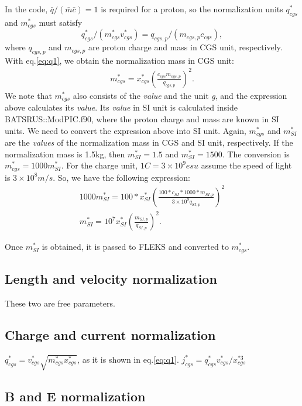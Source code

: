\documentclass[a4paper, 11pt]{article}
\begin{document}
In the code, $\bar{q}/(\bar{m}\bar{c}) = 1$ is required for a proton, so the normalization units $q_{cgs}^*$ and $m_{cgs}^*$ must satisfy 
\begin{equation}
q_{cgs}^*/(m_{cgs}^*v_{cgs}^*) = q_{cgs,p}/(m_{cgs,p}c_{cgs}),     
\end{equation}
where $q_{cgs,p}$ and $m_{cgs,p}$ are proton charge and mass in CGS unit, respectively. With eq.\ref{eq:q1}, we obtain the normalization mass in CGS unit:
\begin{eqnarray}
m_{cgs}^* = x_{cgs}^*(\frac{c_{cgs}m_{cgs,p}}{q_{cgs,p}})^2.
\end{eqnarray}
We note that $m_{cgs}^*$ also consists of the \textit{value} and the unit \textit{g}, and the expression above calculates its \textit{value}. Its \textit{value} in SI unit is calculated inside BATSRUS::ModPIC.f90, where the proton charge and mass are known in SI units. We need to convert the expression above into SI unit. Again, $m_{cgs}^*$ and $m_{SI}^*$ are the \textit{values} of the normalization mass in CGS and SI unit, respectively. If the normalization mass is 1.5kg, then $m_{SI}^* = 1.5$ and $m_{SI}^* = 1500$. The conversion is $m_{cgs}^* = 1000m_{SI}^*$. For the charge unit, $1C = 3\times 10^9 esu$ assume the speed of light is $3 \times 10^8m/s$. So, we have the following expression:
\begin{eqnarray}
1000m_{SI}^* = 100*x_{SI}^*(\frac{100*c_{SI}*1000*m_{SI,p}}{3\times10^9 q_{SI,p}})^2 \\
m_{SI}^* = 10^7x_{SI}^*(\frac{m_{SI,p}}{q_{SI,p}})^2.
\end{eqnarray}

Once $m_{SI}^*$ is obtained, it is passed to FLEKS and converted to $m_{cgs}^*$. 

\subsection{Length and velocity normalization}

These two are free parameters. 

\subsection{Charge and current normalization}

$q_{cgs}^*=v_{cgs}^* \sqrt{m_{cgs}^* x_{cgs}^*}$, as it is shown in eq.\ref{eq:q1}. $j_{cgs}^* = q_{cgs}^*v_{cgs}^*/x_{cgs}^{*3}$

\subsection{B and E normalization}
\end{document}
